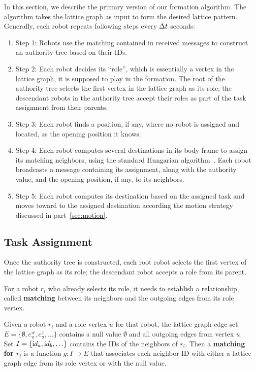 In this section, we describe the primary version of our formation algorithm. 
%
The algorithm takes the lattice graph as input to form the desired lattice pattern. 
%
Generally, each robot repeats following steps every $\Delta t$ seconds:
\begin{enumerate}
\item Step 1: Robots use the matching contained in received messages to
  construct an authority tree based on their IDs.
\item Step 2: Each robot decides its ``role'', which is essentially a vertex in the lattice graph, it is supposed to play in the formation.  
    The root of the authority tree selects the first vertex in the lattice graph as its role; 
    the descendant robots in the authority tree accept their roles as part of the task assignment from their parents. 
\item Step 3: Each robot finds a position, if any, where no robot is assigned and located, as the opening position it knows.
\item Step 4: Each robot computes several destinations in its body frame to
  assign its matching neighbors, using the standard Hungarian
  algorithm~\cite{Kuh55}. 
  Each robot broadcasts a message containing its assignment, along with the authority value, and the opening position, if any, to its neighbors.
\item Step 5: Each robot computes its destination based on the assigned task and moves toward to the assigned destination according the motion strategy discussed in part~\ref{sec:motion}.
\end{enumerate}

\subsection{Task Assignment}
\label{subsec:task}


Once the authority tree is constructed, each root robot selects the first vertex of the lattice graph as its role; the descendant robot accepts a role from its parent.

For a robot $r_i$ who already selects its role, it needs to establish a
relationship, called \textbf{matching} between its neighbors and the outgoing edges from its role vertex. 
\begin{defn}
\label{def:matching}
  Given a robot $r_i$ and a role vertex $u$ for that robot, the lattice
  graph edge set
    $E=\{\emptyset, e_{u}^w, e_{u}^z, \ldots\}$
  contains a null value $\emptyset$ and all outgoing edges from vertex $u$.  
  Set
    $I=\{{\textrm id}_a, {\textrm id}_b, \ldots \}$
  contains the IDs of the neighbors of $r_i$.  
  Then a
  \textbf{matching for $r_i$} is a function $g : I \rightarrow E$ that
  associates each neighbor ID with either a lattice graph edge from its role vertex or with the null value.
\end{defn}

